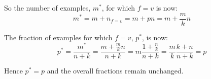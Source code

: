 \documentclass[12pt]{article}
\begin{document}
So the number of examples, $m^*$, for which $f=v$ is now: 
\begin{equation}
    m^* = m + n_{f=v} = m+pn = m+\frac{m}{k}n
\end{equation}

The fraction of examples for which $f=v$, $p^*$, is now: 
\begin{equation}
    p^* = \frac{m^*}{n+k} = \frac{m+\frac{m}{k}n}{n+k} = m\frac{1+\frac{n}{k}}{n+k}
    = \frac{m}{k}\frac{k+n}{n+k} = p
\end{equation}

Hence $p^*=p$ and the overall fractions remain unchanged.
\end{document}
